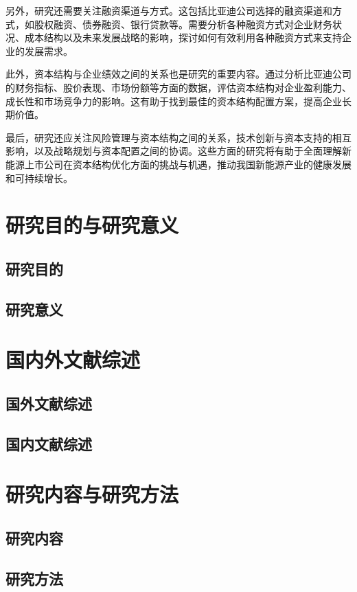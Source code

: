 另外，研究还需要关注融资渠道与方式。这包括比亚迪公司选择的融资渠道和方式，如股权融资、债券融资、银行贷款等。需要分析各种融资方式对企业财务状况、成本结构以及未来发展战略的影响，探讨如何有效利用各种融资方式来支持企业的发展需求。

此外，资本结构与企业绩效之间的关系也是研究的重要内容。通过分析比亚迪公司的财务指标、股价表现、市场份额等方面的数据，评估资本结构对企业盈利能力、成长性和市场竞争力的影响。这有助于找到最佳的资本结构配置方案，提高企业长期价值。

最后，研究还应关注风险管理与资本结构之间的关系，技术创新与资本支持的相互影响，以及战略规划与资本配置之间的协调。这些方面的研究将有助于全面理解新能源上市公司在资本结构优化方面的挑战与机遇，推动我国新能源产业的健康发展和可持续增长。
\section{研究目的与研究意义}
\subsection{研究目的}
\subsection{研究意义}
\section{国内外文献综述}
\subsection{国外文献综述}
\subsection{国内文献综述}
\section{研究内容与研究方法}
\subsection{研究内容}
\subsection{研究方法}
\cite{Brusov2023}
\cite{Cao2018}
\cite{Chen2022}
\cite{Dai2022}
\cite{Dong2019}
\cite{Du2016}
\cite{Gu2022}
\cite{Hong2015}
\cite{Li2019}
\cite{Li2019a}
\cite{Li2021}
\cite{Li2023}
\cite{Liaqat2021}
\cite{Liu2017}
\cite{Liu2019}
\cite{Liu2022}
\cite{Liu2023}


\cite{Ma2022}
\cite{Mbulawa2020}
\cite{Meng2020}
\cite{Modigliani1958}
\cite{Shen2022}
\cite{Song2021}
\cite{Spitsin2020}
\cite{Su2022}
\cite{Sun2020}
\cite{Wan2022}
\cite{Wang2008}
\cite{Wang2021}
\cite{Wangchen2022}
\cite{Xiong2022}
\cite{Xu2022}
\cite{Xu2022a}
\cite{Yang2014}
\cite{Yang2020}
\cite{Yao2022}
\cite{Yu2017}
\cite{Zhang2014}
\cite{Zhang2022}
\cite{Zhang2022a}
\cite{Zhu2022}
\cite{Zhu2023}
\cite{Zuo2020}